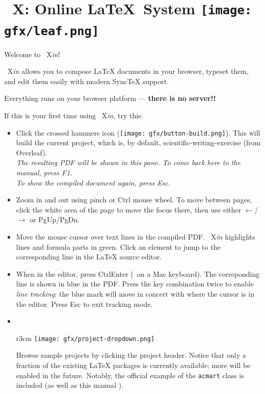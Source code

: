 \documentclass{article}
\newcommand\ToXinB{\mbox{%
    \raisebox{0.4pt}{T}\hspace{-1pt}\raisebox{1pt}{o}%
    \hspace{-1.6pt}X\hspace{-1pt}{\itshape in}}}
\newcommand\ToXin{\mbox{%
    \raisebox{0.5pt}{T}\hspace{-.8pt}\raisebox{1pt}{o}%
    \hspace{-1pt}X{\hspace{-1pt}\itshape in}}}
\newcommand\keyplus{\raisebox{.7pt}{\fontsize{8}{8}\selectfont+}}
\newcommand\myreturn{\fontsize{9}{9}\selectfont\return}
\newcommand\smiley{\raisebox{-1.3pt}{\texttt{[image: gfx/smiley.png]}}}
\begin{document}
\section*{\ToXinB: Online \LaTeX\ System\hfill
\texttt{[image: gfx/leaf.png]}~
}

Welcome to \ToXin! 

\bigskip\noindent
{\ToXin} allows you to compose {\LaTeX} documents in your browser, typeset them,
and edit them easily with modern Sync{\TeX} support.

\bigskip\noindent
Everything runs on your browser platform ---
\textbf{there is no server!!}

\bigskip\noindent
If this is your first time using {\ToXin},
try this:

\begin{itemize}
\item Click the crossed hammers icon
 (\texttt{[image: gfx/button-build.png]}).
 This will build the current project,
 which is, by default, \textsf{scientific-writing-exercise} (from Overleaf). \\[.2em]
 \textit{The resulting PDF will be shown in this pane. To come back here to the manual, press {\rm F1}.}\\[.2em]
 \textit{To show the compiled document again, press {\rm Esc}.}

 
\item Zoom in and out using pinch or Ctrl{\,\keyplus\,}mouse wheel.
To move between pages, click the white area of the page to move the focus there,
then use either $\leftarrow$/$\rightarrow$
or PgUp/PgDn.
 
\item Move the mouse cursor over text lines in the compiled PDF.
{\ToXin} highlights lines and formula parts in green.
Click an element to jump to the corresponding line in the {\LaTeX} source editor.

\item When in the editor, press Ctrl\keyplus Enter ({\cmd\keyplus\myreturn\,} on a Mac keyboard).
The correponding line is shown in blue in the PDF.
Press the key combination twice to enable \emph{line tracking}: the blue mark will move in concert with where the cursor is in the editor.
Press Esc to exit tracking mode.

\item 
\begin{minipage}[t]{4in}
~
\begin{wrapfigure}[7]{r}{3cm}
\vspace{-3.2em}
\texttt{[image: gfx/project-dropdown.png]}
\end{wrapfigure}
\vspace{-2.4em}

Browse sample projects by clicking the project header.
Notice that only a fraction of the existing
{\LaTeX} packages is currently available;
more will be enabled in the future.
Notably, the official example of the
\texttt{acmart} class is included (as well as this manual \smiley).
\end{minipage}


\end{itemize}
\end{document}
